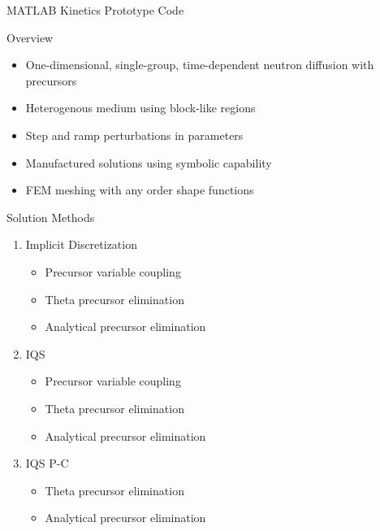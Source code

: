 \documentclass[8pt,xcolor=dvipnames]{beamer}
\begin{document}
\begin{frame}{MATLAB Kinetics Prototype Code}

\begin{block}{Overview}
\begin{itemize}
\item One-dimensional, single-group, time-dependent neutron diffusion with precursors
\item Heterogenous medium using block-like regions
\item Step and ramp perturbations in parameters
\item Manufactured solutions using symbolic capability
\item FEM meshing with any order shape functions
\end{itemize}
\end{block}

\begin{block}{Solution Methods}
\begin{multicols}{2}
\begin{enumerate}
\item Implicit Discretization
\begin{itemize}
\item Precursor variable coupling
\item Theta precursor elimination
\item Analytical precursor elimination
\end{itemize}
\item IQS
\begin{itemize}
\item Precursor variable coupling
\item Theta precursor elimination
\item Analytical precursor elimination
\end{itemize}
\item IQS P-C
\begin{itemize}
\item Theta precursor elimination
\item Analytical precursor elimination
\end{itemize}
\end{enumerate}
\end{multicols}
\end{block}

\end{frame}
\end{document}
